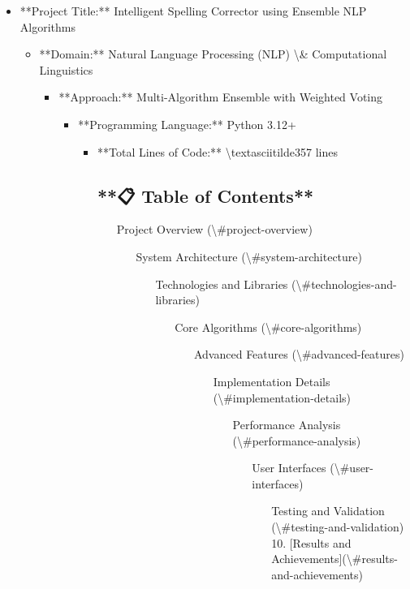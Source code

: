 \documentclass[12pt,a4paper]{article}
\begin{document}
\begin{itemize}
\item **Project Title:** Intelligent Spelling Corrector using Ensemble NLP Algorithms
\begin{itemize}
\item **Domain:** Natural Language Processing (NLP) \textbackslash{}& Computational Linguistics
\begin{itemize}
\item **Approach:** Multi-Algorithm Ensemble with Weighted Voting
\begin{itemize}
\item **Programming Language:** Python 3.12+
\begin{itemize}
\item **Total Lines of Code:** \textbackslash{}textasciitilde{}357 lines


\subsection{**📋 Table of Contents**}


\begin{enumerate}
\item [Project Overview](\textbackslash{}#project-overview)
\begin{enumerate}
\item [System Architecture](\textbackslash{}#system-architecture)
\begin{enumerate}
\item [Technologies and Libraries](\textbackslash{}#technologies-and-libraries)
\begin{enumerate}
\item [Core Algorithms](\textbackslash{}#core-algorithms)
\begin{enumerate}
\item [Advanced Features](\textbackslash{}#advanced-features)
\begin{enumerate}
\item [Implementation Details](\textbackslash{}#implementation-details)
\begin{enumerate}
\item [Performance Analysis](\textbackslash{}#performance-analysis)
\begin{enumerate}
\item [User Interfaces](\textbackslash{}#user-interfaces)
\begin{enumerate}
\item [Testing and Validation](\textbackslash{}#testing-and-validation)
10. [Results and Achievements](\textbackslash{}#results-and-achievements)


\end{enumerate}
\end{enumerate}
\end{enumerate}
\end{enumerate}
\end{enumerate}
\end{enumerate}
\end{enumerate}
\end{enumerate}
\end{enumerate}
\end{itemize}
\end{itemize}
\end{itemize}
\end{itemize}
\end{itemize}
\end{document}
